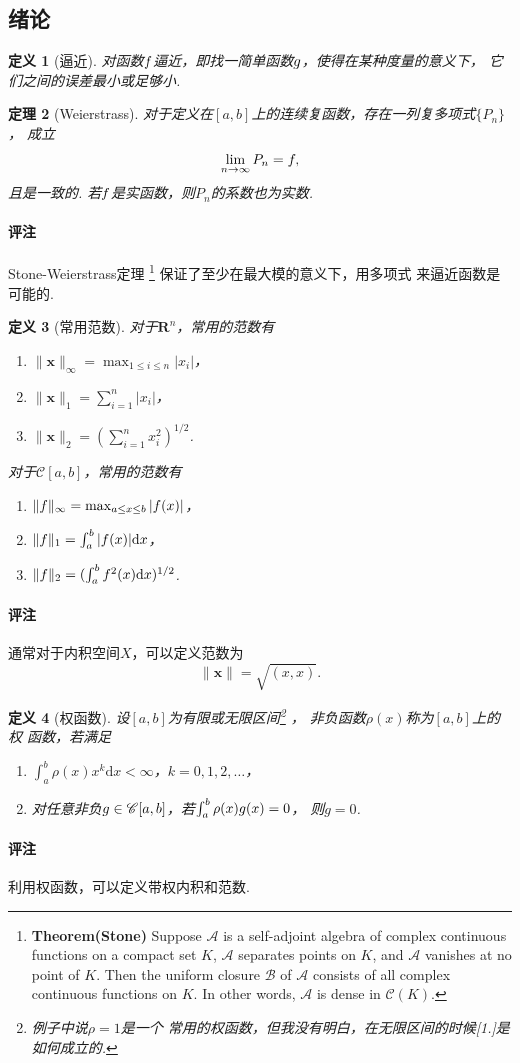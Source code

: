 \documentclass[12pt, a4paper]{article}
\theoremstyle{margin}
\newtheorem{thm}{定理}
\newtheorem{defi}[thm]{定义}
\newcommand{\ms}{\mathscr}
\newcommand{\tbf}{\textbf}
\newcommand{\f}{\mathnormal{f}}
\newcommand{\g}{\mathnormal{g}}
\newcommand{\R}{\mathbf{R}}
\newcommand{\rd}{\mathrm{d}}
\newcommand{\remark}{\paragraph{评注}}
\begin{document}
\subsection{绪论}
  \begin{defi}[逼近]
    对函数$\f$逼近，即找一简单函数$\g$，使得在某种度量的意义下，
    它们之间的误差最小或足够小.
  \end{defi}

  \begin{thm}[Weierstrass]
    对于定义在$[a, b]$上的连续复函数，存在一列复多项式$\{P_n\}$，
    成立
    \[
      \lim_{n\to\infty}P_n = \f,
    \]
    且是一致的. 若$\f$是实函数，则$P_n$的系数也为实数.
  \end{thm}
  \remark
    Stone-Weierstrass定理
    \footnote{
      \tbf{Theorem(Stone) }
      Suppose $\ms{A}$ is a self-adjoint algebra of complex
      continuous functions on a compact set $K$, $\ms{A}$
      separates points on $K$, and $\ms{A}$ vanishes at no
      point of $K$. Then the uniform closure $\ms{B}$ of
      $\ms{A}$ consists of all complex continuous functions
      on $K$. In other words, $\ms{A}$ is dense in $\ms{C}(K)$.
    }
    保证了至少在最大模的意义下，用多项式
    来逼近函数是可能的.

  \begin{defi}[常用范数]
    对于$\R^n$，常用的范数有
    \begin{enumerate}
      \item $\|\tbf{x}\|_\infty = \max_{1\le i\le n}|x_i|$，
      \item $\|\tbf{x}\|_1 = \sum_{i=1}^n|x_i|$，
      \item $\|\tbf{x}\|_2 = (\sum_{i=1}^nx_i^2)^{1/2}$.
    \end{enumerate}
    对于$\ms{C}[a, b]$，常用的范数有
    \begin{enumerate}
      \item $\|\f\|_\infty = \max_{a\le x\le b}|\f(x)|$，
      \item $\|\f\|_1 = \int_a^b|\f(x)|\rd x$，
      \item $\|\f\|_2 = (\int_a^b\f^2(x) \rd x)^{1/2}$.
    \end{enumerate}
  \end{defi}
  \remark
    通常对于内积空间$X$，可以定义范数为
    \[
      \|\tbf{x}\| = \sqrt{(x, x)}.
    \]

  \begin{defi}[权函数]
    \label{defi: 权函数}
    设$[a,b]$为有限或无限区间\footnote{例子中说$\rho=1$是一个
    常用的权函数，但我没有明白，在无限区间的时候[1.]是如何成立的. }
    ，
    非负函数$\rho(x)$称为$[a,b]$上的权
    函数，若满足
    \begin{enumerate}
      \item $\int_a^b\rho(x)x^k\rd x < \infty$，$k=0,1,2,\dots$，
      \item 对任意非负$\g\in\ms{C}[a, b]$，若$\int_a^b\rho(x)\g(x)=0$，
      则$g=0$.
    \end{enumerate}
  \end{defi}
  \remark
    利用权函数，可以定义带权内积和范数.
\end{document}
